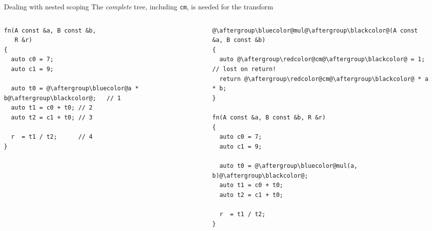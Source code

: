 \documentclass[xcolor=dvipsnames]{beamer}
\begin{document}
\begin{frame}[fragile]{Dealing with nested scoping}
The \emph{complete} tree, including {\color{red}\texttt{cm}}, is needed for the transform
  \begin{columns}[T] %
    \begin{column}{0.44\textwidth}
        \begin{lstlisting}
fn(A const &a, B const &b,
   R &r)
{
  auto c0 = 7;
  auto c1 = 9;

  auto t0 = @\aftergroup\bluecolor@a * b@\aftergroup\blackcolor@;   // 1
  auto t1 = c0 + t0; // 2
  auto t2 = c1 + t0; // 3

  r  = t1 / t2;      // 4
}
  \end{lstlisting}
    \end{column}%
    \hfill%
    \begin{column}{0.56\textwidth}
      \begin{lstlisting}
@\aftergroup\bluecolor@mul@\aftergroup\blackcolor@(A const &a, B const &b)
{
  auto @\aftergroup\redcolor@cm@\aftergroup\blackcolor@ = 1; // lost on return!
  return @\aftergroup\redcolor@cm@\aftergroup\blackcolor@ * a * b;
}

fn(A const &a, B const &b, R &r)
{
  auto c0 = 7;
  auto c1 = 9;

  auto t0 = @\aftergroup\bluecolor@mul(a, b)@\aftergroup\blackcolor@;
  auto t1 = c0 + t0;
  auto t2 = c1 + t0;

  r  = t1 / t2;
}
  \end{lstlisting}
    \end{column}%
  \end{columns}
\end{frame}
\end{document}
